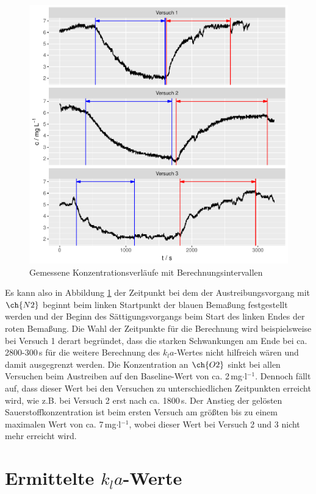 \documentclass[12pt,liststotoc]{report}
\begin{document}
\begin{figure}[H]
\centering
\includegraphics[width=1\textwidth]{Graphics/test.pdf} 
\caption[Gemessene Konzentrationsverläufe]{Gemessene Konzentrationsverläufe mit Berechnungsintervallen}
\label{cmessung}
\end{figure}
\noindent
Es kann also in Abbildung \ref{cmessung} der Zeitpunkt bei dem der Austreibungsvorgang mit $\ch{N2}$ beginnt beim linken Startpunkt der blauen Bemaßung festgestellt werden und der Beginn des Sättigungsvorgangs beim Start des linken Endes der roten Bemaßung. Die Wahl der Zeitpunkte für die Berechnung wird beispielsweise bei Versuch 1 derart begründet, dass die starken Schwankungen am Ende bei ca. 2800-300\,s für die weitere Berechnung des $k_la$-Wertes nicht hilfreich wären und damit ausgegrenzt werden. Die Konzentration an $\ch{O2}$ sinkt bei allen Versuchen beim Austreiben auf den Baseline-Wert von ca. 2\,mg$\cdot$l$^{-1}$. Dennoch fällt auf, dass dieser Wert bei den Versuchen zu unterschiedlichen Zeitpunkten erreicht wird, wie z.B. bei Versuch 2 erst nach ca. 1800\,s. Der Anstieg der gelösten Sauerstoffkonzentration ist beim ersten Versuch am größten bis zu einem maximalen Wert von ca. 7\,mg$\cdot$l$^{-1}$, wobei dieser Wert bei Versuch 2 und 3 nicht mehr erreicht wird.

\section{Ermittelte $k_la$-Werte}
\label{sec:kla}
\end{document}
